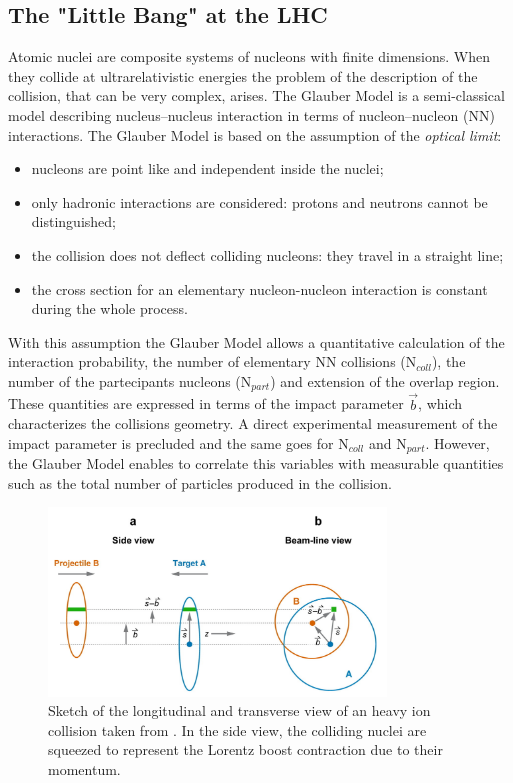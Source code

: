 %
\subsection{The "Little Bang" at the LHC}
\label{sec:1.3.1}

Atomic nuclei are composite systems of nucleons with finite dimensions. When they collide at 
ultrarelativistic energies the problem of the description of the collision, that can be very
complex, arises.
The Glauber Model \cite{glauber} is a semi-classical model describing nucleus–nucleus 
interaction in terms of nucleon–nucleon (NN) interactions.
The Glauber Model is based on the assumption of the \textit{optical limit}:
\begin{itemize}
    \item nucleons are point like and independent inside the nuclei;
    \item only hadronic interactions are considered: protons and neutrons cannot be distinguished;
    \item the collision does not deflect colliding nucleons: they travel in a straight line;
    \item the cross section for an elementary nucleon-nucleon interaction is constant during the whole 
    process.
\end{itemize}
With this assumption the Glauber Model allows a quantitative calculation of the interaction
probability, the number of elementary NN collisions ($\mathrm{N}_{coll}$), the number
of the partecipants nucleons ($\mathrm{N}_{part}$) and extension of the overlap region.
These quantities are expressed in terms of the impact parameter $\vec{b}$, which characterizes
the collisions geometry.
A direct experimental measurement of the impact parameter is precluded and the same goes for
$\mathrm{N}_{coll}$ and $\mathrm{N}_{part}$.
However, the Glauber Model enables to correlate this variables with measurable quantities
such as the total number of particles produced in the collision.

\begin{figure}[!h]
    \centering
    \includegraphics[width=0.8\textwidth]{gfx/glauber}
	\caption{Sketch of the longitudinal and transverse view of an heavy ion collision taken from \cite{glauber}. In the side view, the colliding nuclei are squeezed to represent the Lorentz boost contraction due to their momentum.}
	\label{fig:glauber}
\end{figure}

